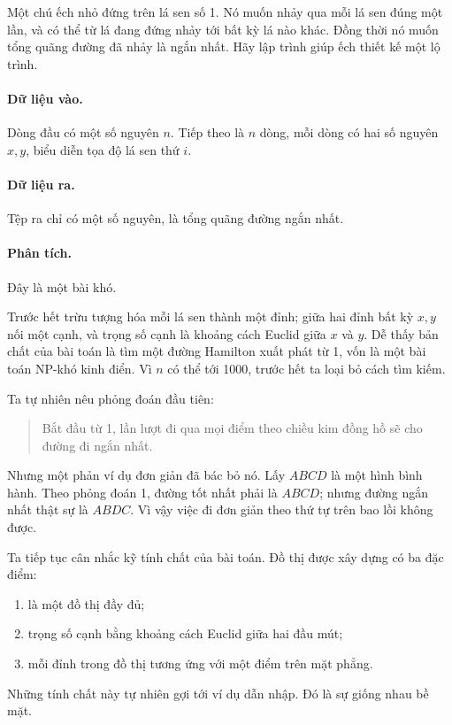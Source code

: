 \documentclass[11pt]{article}
\begin{document}
Một chú ếch nhỏ đứng trên lá sen số 1. Nó muốn nhảy qua mỗi lá sen đúng một
lần, và có thể từ lá đang đứng nhảy tới bất kỳ lá nào khác. Đồng thời nó muốn
tổng quãng đường đã nhảy là ngắn nhất. Hãy lập trình giúp ếch thiết kế một
lộ trình.

\paragraph{Dữ liệu vào.}
Dòng đầu có một số nguyên \(n\). Tiếp theo là \(n\) dòng, mỗi dòng có hai số
nguyên \(x,y\), biểu diễn tọa độ lá sen thứ \(i\).

\paragraph{Dữ liệu ra.}
Tệp ra chỉ có một số nguyên, là tổng quãng đường ngắn nhất.

\paragraph{Phân tích.}
Đây là một bài khó.

Trước hết trừu tượng hóa mỗi lá sen thành một đỉnh; giữa hai đỉnh bất kỳ
\(x,y\) nối một cạnh, và trọng số cạnh là khoảng cách Euclid giữa \(x\) và
\(y\). Dễ thấy bản chất của bài toán là tìm một đường Hamilton xuất phát từ
1, vốn là một bài toán NP-khó kinh điển. Vì \(n\) có thể tới 1000, trước hết
ta loại bỏ cách tìm kiếm.

Ta tự nhiên nêu phỏng đoán đầu tiên:

\begin{quote}
 Bắt đầu từ 1, lần lượt đi qua mọi điểm theo chiều kim
đồng hồ sẽ cho đường đi ngắn nhất.
\end{quote}

Nhưng một phản ví dụ đơn giản đã bác bỏ nó. Lấy \(ABCD\) là một hình bình
hành. Theo phỏng đoán 1, đường tốt nhất phải là \(ABCD\); nhưng đường ngắn
nhất thật sự là \(ABDC\). Vì vậy việc đi đơn giản theo thứ tự trên bao lồi
không được.

Ta tiếp tục cân nhắc kỹ tính chất của bài toán. Đồ thị được xây dựng có ba
đặc điểm:
\begin{enumerate}
  \item là một đồ thị đầy đủ;
  \item trọng số cạnh bằng khoảng cách Euclid giữa hai đầu mút;
  \item mỗi đỉnh trong đồ thị tương ứng với một điểm trên mặt phẳng.
\end{enumerate}
Những tính chất này tự nhiên gợi tới ví dụ dẫn nhập. Đó là sự giống nhau bề
mặt.
\end{document}

